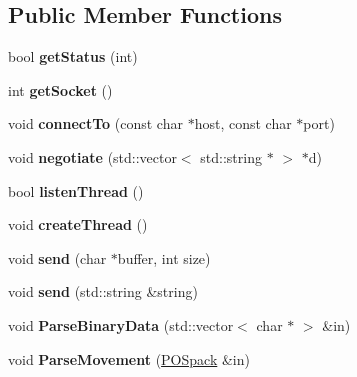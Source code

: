 \subsection*{Public Member Functions}
\begin{DoxyCompactItemize}
\item 
bool {\bfseries get\+Status} (int)\hypertarget{classmmoc_a4575f066069b526b9bdd9297f0191dd4}{}\label{classmmoc_a4575f066069b526b9bdd9297f0191dd4}

\item 
int {\bfseries get\+Socket} ()\hypertarget{classmmoc_a9c2ceebf5f396356be065cadfd0f2481}{}\label{classmmoc_a9c2ceebf5f396356be065cadfd0f2481}

\item 
void {\bfseries connect\+To} (const char $\ast$host, const char $\ast$port)\hypertarget{classmmoc_a0beddd01417d12d1a7378aee0530b96d}{}\label{classmmoc_a0beddd01417d12d1a7378aee0530b96d}

\item 
void {\bfseries negotiate} (std\+::vector$<$ std\+::string $\ast$ $>$ $\ast$d)\hypertarget{classmmoc_a83b0f0aea9d58081e88ae61560a5b25c}{}\label{classmmoc_a83b0f0aea9d58081e88ae61560a5b25c}

\item 
bool {\bfseries listen\+Thread} ()\hypertarget{classmmoc_a5cb5a7b8370f2f0c8930764586e54cd5}{}\label{classmmoc_a5cb5a7b8370f2f0c8930764586e54cd5}

\item 
void {\bfseries create\+Thread} ()\hypertarget{classmmoc_afc779a8d478a7c514c9f64fada57cf2d}{}\label{classmmoc_afc779a8d478a7c514c9f64fada57cf2d}

\item 
void {\bfseries send} (char $\ast$buffer, int size)\hypertarget{classmmoc_a773961293872805a3c779dc2a3f7d43a}{}\label{classmmoc_a773961293872805a3c779dc2a3f7d43a}

\item 
void {\bfseries send} (std\+::string \&string)\hypertarget{classmmoc_a9554067bea3b76e4832f551882ca621c}{}\label{classmmoc_a9554067bea3b76e4832f551882ca621c}

\item 
void {\bfseries Parse\+Binary\+Data} (std\+::vector$<$ char $\ast$ $>$ \&in)\hypertarget{classmmoc_a24409e15b16635694f663b9afb2e8a07}{}\label{classmmoc_a24409e15b16635694f663b9afb2e8a07}

\item 
void {\bfseries Parse\+Movement} (\hyperlink{classPOSpack}{P\+O\+Spack} \&in)\hypertarget{classmmoc_a0a556d51f2b9dfa13a128c56ad76b783}{}\label{classmmoc_a0a556d51f2b9dfa13a128c56ad76b783}


\end{DoxyCompactItemize}
